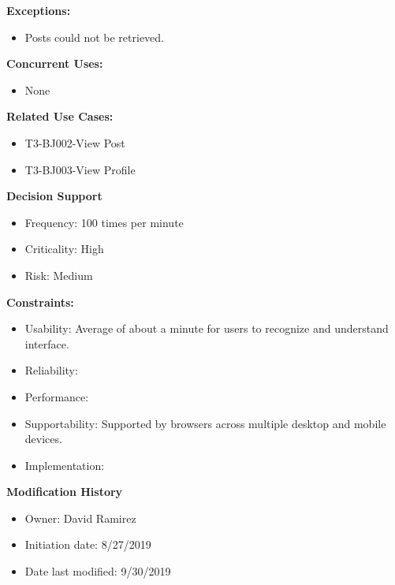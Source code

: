 \textbf{Exceptions:}
\begin{itemize}
    \item Posts could not be retrieved.
\end{itemize}
\textbf{Concurrent Uses:}
\begin{itemize}
    \item None
\end{itemize}
\textbf{Related Use Cases:}
\begin{itemize}
    \item T3-BJ002-View Post
    \item T3-BJ003-View Profile
\end{itemize}
\textbf{Decision Support}
\begin{itemize}
    \item Frequency: 100 times per minute
    \item Criticality: High
    \item Risk: Medium
\end{itemize}
\textbf{Constraints:}
\begin{itemize}
    \item Usability: Average of about a minute for users to recognize and understand interface.
    \item Reliability: 
    \item Performance:
    \item Supportability: Supported by browsers across multiple desktop and mobile devices.
    \item Implementation:
\end{itemize}
\textbf{Modification History}
\begin{itemize}
    \item Owner: David Ramirez
    \item Initiation date: 8/27/2019
    \item Date last modified: 9/30/2019
\end{itemize}